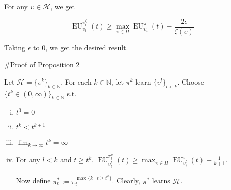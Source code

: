 \documentclass[a4paper]{article}
\newcommand{\Nats}{\mathbb{N}}
\newcommand{\Hy}{\mathcal{H}}
\newcommand{\EU}{\operatorname{EU}}
\begin{document}
For any $\upsilon \in \Hy$, we get

$$\EU_{\upsilon_t}^{\pi^\zeta_t}(t) \geq \max_{\pi \in \Pi} \EU_{\upsilon_t}^{\pi}(t) - \frac{2\epsilon}{\zeta(\upsilon)}$$

Taking $\epsilon$ to 0, we get the desired result.

\#Proof of Proposition 2

Let $\Hy = \{\upsilon^k\}_{k \in \Nats}$. For each $k \in \Nats$, let $\pi^k$ learn $\{\upsilon^l\}_{l < k}$. Choose $\{t^k \in (0,\infty)\}_{k \in \Nats}$ s.t.

\begin{enumerate}[i.]

\item $t^0 = 0$
\item $t^k < t^{k+1}$
\item $\lim_{k \rightarrow \infty} t^k = \infty$
\item For any $l < k$ and $t \geq t^k$, $\EU_{\upsilon^l_t}^{\pi^k_t}(t) \geq \max_{\pi \in \Pi} \EU_{\upsilon^l_t}^\pi(t) - \frac{1}{k+1}$.

Now define $\pi^*_t:=\pi_t^{\max\{k \mid t \geq t^k\}}$. Clearly, $\pi^*$ learns $\Hy$.

\end{enumerate}
\end{document}
